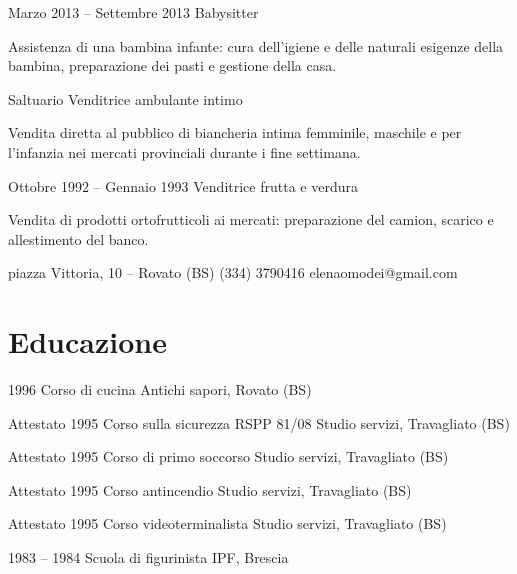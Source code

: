 \documentclass[fontsize=10pt]{tccv}
\begin{document}
\begin{eventlist}

\item{Marzo 2013 -- Settembre 2013}
     {}
     {Babysitter}

Assistenza di una bambina infante: cura dell'igiene e delle naturali
esigenze della bambina, preparazione dei pasti e gestione della casa.

\item{Saltuario}
     {}
     {Venditrice ambulante intimo}

Vendita diretta al pubblico di biancheria intima femminile, maschile e
per l'infanzia nei mercati provinciali durante i fine settimana.

\item{Ottobre 1992 -- Gennaio 1993}
     {}
     {Venditrice frutta e verdura}

Vendita di prodotti ortofrutticoli ai mercati: preparazione del camion,
scarico e allestimento del banco.

\end{eventlist}


\personal
	[]
	{}
    {piazza Vittoria, 10 -- Rovato (BS)}
    {(334) 3790416}
    {elenaomodei@gmail.com}


\section{Educazione}

\begin{yearlist}

\item{1996}
     {Corso di cucina}
     {Antichi sapori, Rovato (BS)}

\item[Attestato]{1995}
     {Corso sulla sicurezza RSPP 81/08}
     {Studio servizi, Travagliato (BS)}

\item[Attestato]{1995}
     {Corso di primo soccorso}
     {Studio servizi, Travagliato (BS)}

\item[Attestato]{1995}
     {Corso antincendio}
     {Studio servizi, Travagliato (BS)}

\item[Attestato]{1995}
     {Corso videoterminalista}
     {Studio servizi, Travagliato (BS)}

\item{1983 -- 1984}
     {Scuola di figurinista}
     {IPF, Brescia}

\end{yearlist}
\end{document}
